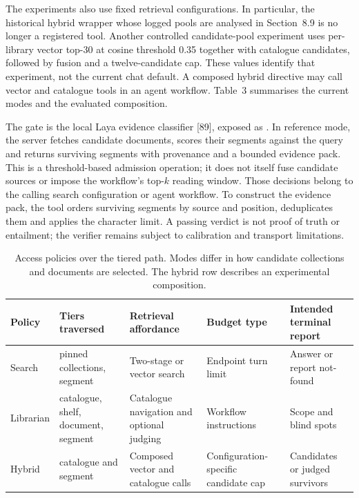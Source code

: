\documentclass[11pt]{article}
\begin{document}
The experiments also use fixed retrieval configurations. In particular, the
historical hybrid wrapper whose logged pools are analysed in
Section~8.9 is no longer a
registered tool. Another controlled candidate-pool experiment uses per-library
vector top-30 at cosine threshold 0.35 together with catalogue candidates,
followed by fusion and a twelve-candidate cap. These values identify that
experiment, not the current chat default. A composed hybrid directive may call
vector and catalogue tools in an agent workflow. Table~3
summarises the current modes and the evaluated composition.

The gate is the local Laya evidence classifier [89], exposed as
. In reference mode, the server fetches candidate
documents, scores their segments against the query and returns surviving
segments with provenance and a bounded evidence pack. This is a threshold-based
admission operation; it does not itself fuse candidate sources or impose the
workflow's top-$k$ reading window. Those decisions belong to the calling search
configuration or agent workflow. To construct the evidence pack, the tool
orders surviving segments by source and position, deduplicates them and applies
the character limit. A passing verdict
is not proof of truth or entailment; the verifier remains subject to calibration
and transport limitations.

\begin{table}
\centering
\small
\setlength{\tabcolsep}{5pt}
\caption{Access policies over the tiered path. Modes differ in how candidate collections and documents are selected.
The hybrid row describes an experimental composition.}

\begin{tabular}{@{}p{4cm}p{4cm}p{4cm}p{4cm}p{4cm}@{}}
\toprule
Policy & Tiers traversed & Retrieval affordance & Budget type & Intended terminal report\\
\midrule
Search & pinned collections, segment & Two-stage or vector search & Endpoint turn limit & Answer or report not-found\\
Librarian & catalogue, shelf, document, segment & Catalogue navigation and optional judging & Workflow instructions & Scope and blind spots\\
Hybrid & catalogue and segment & Composed vector and catalogue calls & Configuration-specific candidate cap & Candidates or judged survivors\\
\bottomrule
\end{tabular}
\end{table}
\end{document}
